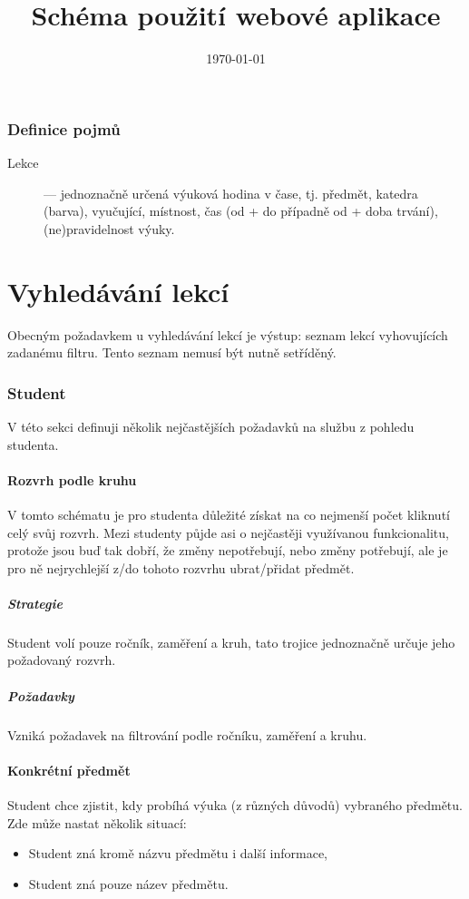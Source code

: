 \documentclass[a4paper, 11pt]{article}
\title{Schéma použití webové aplikace}
\date{\today}
\begin{document}
\maketitle
\section{Definice pojmů}
\begin{description}
\item[Lekce] --- jednoznačně určená výuková hodina v čase, tj. předmět, katedra (barva), vyučující, místnost, čas (od + do případně od + doba trvání), (ne)pravidelnost výuky.
\end{description}

\part{Vyhledávání lekcí}
Obecným požadavkem u vyhledávání lekcí je výstup: seznam lekcí vyhovujících zadanému filtru. Tento seznam nemusí být nutně setříděný.

\section{Student}
V této sekci definuji několik nejčastějších požadavků na službu z pohledu studenta.

\subsection{Rozvrh podle kruhu}
V tomto schématu je pro studenta důležité získat na co nejmenší počet kliknutí celý svůj rozvrh. Mezi studenty půjde asi o nejčastěji využívanou funkcionalitu, protože jsou buď tak dobří, že změny nepotřebují, nebo změny potřebují, ale je pro ně nejrychlejší z/do tohoto rozvrhu ubrat/přidat předmět.

\subsubsection{Strategie}
Student volí pouze ročník, zaměření a kruh, tato trojice jednoznačně určuje jeho požadovaný rozvrh.

\subsubsection{Požadavky}
Vzniká požadavek na filtrování podle ročníku, zaměření a kruhu.

\subsection{Konkrétní předmět}
Student chce zjistit, kdy probíhá výuka (z různých důvodů) vybraného předmětu. Zde může nastat několik situací:
\begin{itemize}
\item Student zná kromě názvu předmětu i další informace,
\item Student zná pouze název předmětu.
\end{itemize}
\end{document}

